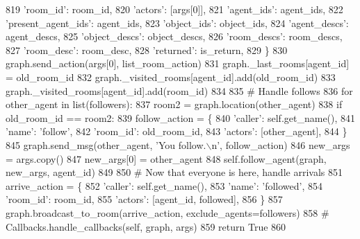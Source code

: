 \begin{DoxyCode}
819             \textcolor{stringliteral}{'room\_id'}: room\_id,
820             \textcolor{stringliteral}{'actors'}: [args[0]],
821             \textcolor{stringliteral}{'agent\_ids'}: agent\_ids,
822             \textcolor{stringliteral}{'present\_agent\_ids'}: agent\_ids,
823             \textcolor{stringliteral}{'object\_ids'}: object\_ids,
824             \textcolor{stringliteral}{'agent\_descs'}: agent\_descs,
825             \textcolor{stringliteral}{'object\_descs'}: object\_descs,
826             \textcolor{stringliteral}{'room\_descs'}: room\_descs,
827             \textcolor{stringliteral}{'room\_desc'}: room\_desc,
828             \textcolor{stringliteral}{'returned'}: is\_return,
829         \}
830         graph.send\_action(args[0], list\_room\_action)
831         graph.\_last\_rooms[agent\_id] = old\_room\_id
832         graph.\_visited\_rooms[agent\_id].add(old\_room\_id)
833         graph.\_visited\_rooms[agent\_id].add(room\_id)
834 
835         \textcolor{comment}{# Handle follows}
836         \textcolor{keywordflow}{for} other\_agent \textcolor{keywordflow}{in} list(followers):
837             room2 = graph.location(other\_agent)
838             \textcolor{keywordflow}{if} old\_room\_id == room2:
839                 follow\_action = \{
840                     \textcolor{stringliteral}{'caller'}: self.get\_name(),
841                     \textcolor{stringliteral}{'name'}: \textcolor{stringliteral}{'follow'},
842                     \textcolor{stringliteral}{'room\_id'}: old\_room\_id,
843                     \textcolor{stringliteral}{'actors'}: [other\_agent],
844                 \}
845                 graph.send\_msg(other\_agent, \textcolor{stringliteral}{'You follow.\(\backslash\)n'}, follow\_action)
846                 new\_args = args.copy()
847                 new\_args[0] = other\_agent
848                 self.follow\_agent(graph, new\_args, agent\_id)
849 
850         \textcolor{comment}{# Now that everyone is here, handle arrivals}
851         arrive\_action = \{
852             \textcolor{stringliteral}{'caller'}: self.get\_name(),
853             \textcolor{stringliteral}{'name'}: \textcolor{stringliteral}{'followed'},
854             \textcolor{stringliteral}{'room\_id'}: room\_id,
855             \textcolor{stringliteral}{'actors'}: [agent\_id, followed],
856         \}
857         graph.broadcast\_to\_room(arrive\_action, exclude\_agents=followers)
858         \textcolor{comment}{# Callbacks.handle\_callbacks(self, graph, args)}
859         \textcolor{keywordflow}{return} \textcolor{keyword}{True}
860 
\end{DoxyCode}
\mbox{\label{classlight__chats_1_1graph_1_1MoveAgentFunction_a7ca8113d7746de96f740eaa61bda0c32}} 
